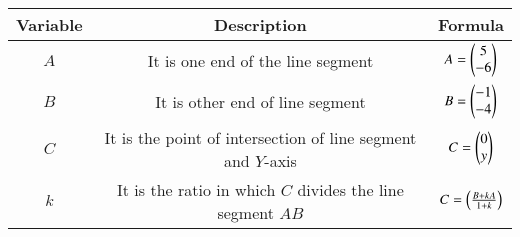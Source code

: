\begin{center}
    \begin{tabular}{|c|c|c|} 
        \hline
            \textbf{Variable} & \textbf{Description} & \textbf{Formula} \\ 
        \hline
            $A$   & It is one end of the line segment & $A = \begin{pmatrix}5 \\ -6\end{pmatrix}$ \\ 
        \hline
            $B$   & It is other end of line segment &  $B = \begin{pmatrix}-1\\-4\end{pmatrix}$\\ 
        \hline
            $C$   & It is the point of intersection of line segment and $Y$-axis & $C  = \begin{pmatrix}0\\y\end{pmatrix}$\\ 
        \hline
            $k$   & It is the ratio in which $C$ divides the line segment $AB$ & $C  = \left(\frac{B + kA}{1 + k}\right)$\\ 
        \hline
    \end{tabular}
\end{center}  
